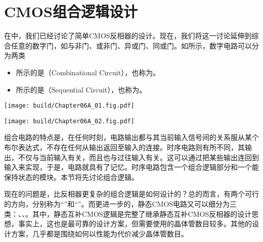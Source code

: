 \chapter{CMOS组合逻辑设计}
在中，我们已经讨论了简单CMOS反相器的设计。现在，我们将这一讨论延伸到综合任意的数字门，如与非门、或非门、异或门、同或门。如所示，数字电路可以分为两类
\begin{itemize}
    \item {}所示的是（Combinational Circuit），也称为。
    \item {}所示的是（Sequential Circuit），也称为。
\end{itemize}

\begin{Figure}[数字电路的高层次分类]
    \begin{FigureSub}[组合电路]
        \texttt{[image: build/Chapter06A\_01.fig.pdf]}
    \end{FigureSub}
    \hspace{1cm}
    \begin{FigureSub}[时序电路]
        \texttt{[image: build/Chapter06A\_02.fig.pdf]}
    \end{FigureSub}
\end{Figure}
组合电路的特点是，在任何时刻，电路输出都与其当前输入信号间的关系服从某个布尔表达式，不存在任何从输出返回至输入的连接。时序电路则有所不同，其输出，不仅与当前输入有关，而且也与过往输入有关。这可以通过把某些输出连回到输入来实现，于是，电路就具有了记忆。时序电路包含一个组合逻辑部分和一个能保持状态的模块。本节将先讨论组合逻辑。

现在的问题是，比反相器更复杂的组合逻辑是如何设计的？总的而言，有两个可行的方向，分别称为“”和“”。而更进一步的，静态CMOS电路又可以细分为三类：、、。其中，静态互补CMOS逻辑是完整了继承静态互补CMOS反相器的设计思想，事实上，这也是最可靠的设计方案，但需要使用的晶体管数目较多。其他的设计方案，几乎都是围绕如何以性能为代价减少晶体管数目。


